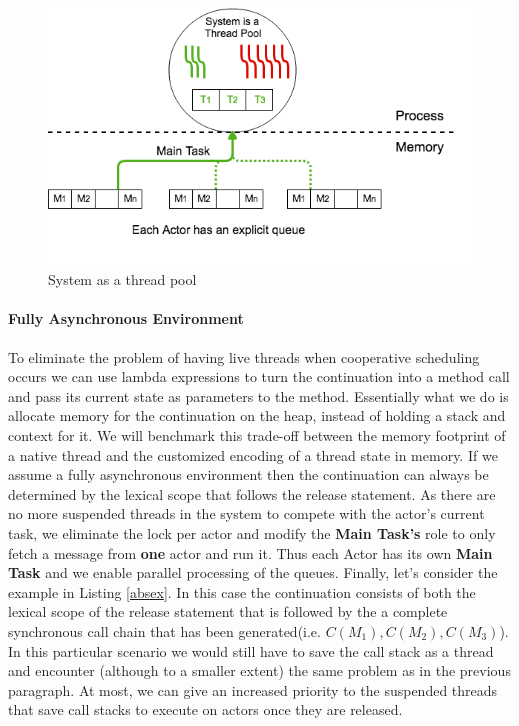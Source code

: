 \begin{figure}
	\label{stp}
	\centering
	\includegraphics[scale=0.5]{stp.png}
	\caption{System as a thread pool}
\end{figure}

\paragraph{Fully Asynchronous Environment}
To eliminate the problem of having live threads when cooperative scheduling occurs we can use lambda expressions to turn the continuation into a method call and pass its current state as parameters to the method. Essentially what we do is allocate memory for the continuation on the heap, instead of holding a stack and context for it. We will benchmark this trade-off between the memory footprint of a native thread and the customized encoding of a thread state in memory.  If we assume a fully asynchronous environment then the continuation can always be determined by the lexical scope that follows the release statement. As there are no more suspended threads in the system to compete with the actor's current task, we eliminate the lock per actor and modify the \textbf{Main Task's} role to only fetch a message from \textbf{one} actor and run it. Thus each Actor has its own \textbf{Main Task} and we enable parallel processing of the queues. Finally, let's consider the example in Listing \ref{absex}. In this case the continuation consists of both the lexical scope of the release statement that is followed by the a complete synchronous call chain that has been generated(i.e. $C(M_1), C(M_2), C(M_3)$). In this particular scenario we would still have to save the call stack as a thread and encounter (although to a smaller extent) the same problem as in the previous paragraph. At most, we can give an increased priority to the suspended threads that save call stacks to execute on actors once they are released.

